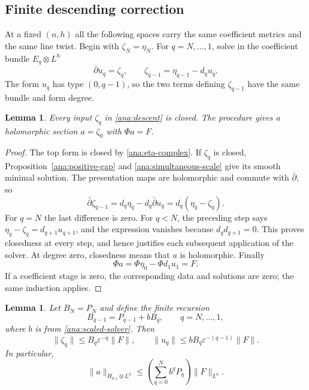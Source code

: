 \documentclass[11pt,reqno]{amsart}
\numberwithin{equation}{section}
\newtheorem{lemma}[theorem]{Lemma}
\theoremstyle{definition}
\theoremstyle{remark}
\begin{document}
\subsection{Finite descending correction}

At a fixed $(n,h)$ all the following spaces carry the same coefficient
metrics and the same line twist.  Begin with $\zeta_N=\eta_N$.
For $q=N,\ldots,1$, solve in the coefficient bundle $E_q\otimes L^h$
\begin{equation}\label{ana:descent}
 \bar\partial u_q=\zeta_q,
 \qquad
 \zeta_{q-1}=\eta_{q-1}-d_qu_q.
\end{equation}
The form $u_q$ has type $(0,q-1)$, so the two terms defining
$\zeta_{q-1}$ have the same bundle and form degree.

\begin{lemma}\label{ana:descent-closed}
Every input $\zeta_q$ in \eqref{ana:descent} is closed.
The procedure gives a holomorphic section $a=\zeta_0$ with
$\Phi a=F$.
\end{lemma}

\begin{proof}
The top form is closed by \eqref{ana:eta-complex}.  If $\zeta_q$
is closed, Proposition~\ref{ana:positive-gap} and
\eqref{ana:simultaneous-scale} give its smooth minimal solution.
The presentation maps are holomorphic and commute with
$\bar\partial$, so
\[
 \bar\partial\zeta_{q-1}
 =d_q\eta_q-d_q\bar\partial u_q
 =d_q(\eta_q-\zeta_q).
\]
For $q=N$ the last difference is zero.  For $q<N$, the preceding
step says $\eta_q-\zeta_q=d_{q+1}u_{q+1}$, and the expression
vanishes because $d_qd_{q+1}=0$.  This proves closedness at every
step, and hence justifies each subsequent application of the solver.
At degree zero, closedness means that $a$ is holomorphic.  Finally
\[
 \Phi a=\Phi\eta_0-\Phi d_1u_1=F.
\]
If a coefficient stage is zero, the corresponding data and solutions
are zero; the same induction applies.
\end{proof}

\begin{lemma}\label{ana:descent-norm}
Let $B_N=P_N$ and define the finite recursion
\[
 B_{q-1}=P_{q-1}+bB_q,
 \qquad q=N,\ldots,1,
\]
where $b$ is from \eqref{ana:scaled-solver}.  Then
\[
 \|\zeta_q\|\leq B_q\varepsilon^{-q}\|F\|,
 \qquad
 \|u_q\|\leq bB_q\varepsilon^{-(q-1)}\|F\|.
\]
In particular,
\begin{equation}\label{ana:final-lift-bound}
 \|a\|_{H_{0,\varepsilon}\otimes L^h}
 \leq \left(\sum_{q=0}^N b^qP_q\right)\|F\|_{L^h}.
\end{equation}
\end{lemma}
\end{document}
